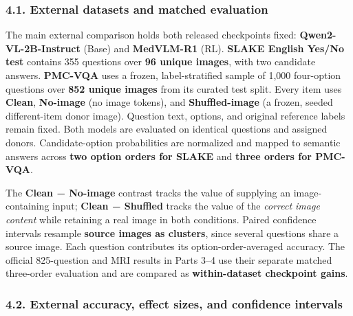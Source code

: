\documentclass[
  10pt,
  a4paper,
]{article}
\begin{document}
\subsubsection{4.1. External datasets and matched
evaluation}\label{external-datasets-and-matched-evaluation}

The main external comparison holds both released checkpoints fixed:
\textbf{Qwen2-VL-2B-Instruct} (Base) and \textbf{MedVLM-R1} (RL).
\textbf{SLAKE English Yes/No test} contains 355 questions over
\textbf{96 unique images}, with two candidate answers. \textbf{PMC-VQA}
uses a frozen, label-stratified sample of 1,000 four-option questions
over \textbf{852 unique images} from its curated test split. Every item
uses \textbf{Clean}, \textbf{No-image} (no image tokens), and
\textbf{Shuffled-image} (a frozen, seeded different-item donor image).
Question text, options, and original reference labels remain fixed. Both
models are evaluated on identical questions and assigned donors.
Candidate-option probabilities are normalized and mapped to semantic
answers across \textbf{two option orders for SLAKE} and \textbf{three
orders for PMC-VQA}.

The \textbf{Clean − No-image} contrast tracks the value of supplying an
image-containing input; \textbf{Clean − Shuffled} tracks the value of
the \emph{correct image content} while retaining a real image in both
conditions. Paired confidence intervals resample \textbf{source images
as clusters}, since several questions share a source image. Each
question contributes its option-order-averaged accuracy. The official
825-question and MRI results in Parts 3--4 use their separate matched
three-order evaluation and are compared as \textbf{within-dataset
checkpoint gains}.

\subsubsection{4.2. External accuracy, effect sizes, and confidence
intervals}\label{external-accuracy-effect-sizes-and-confidence-intervals}
\end{document}
